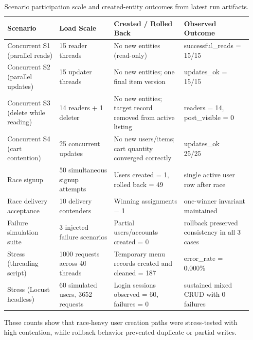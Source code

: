 \documentclass[a4paper, 11pt]{article}
\begin{document}
\renewcommand{\arraystretch}{1.25}
\begin{table}[h]
\centering
\begin{tabularx}{\textwidth}{|p{4.1cm}|p{4.0cm}|p{4.4cm}|X|}
\hline
\rowcolor{HeaderGray}
\textbf{Scenario} & \textbf{Load Scale} & \textbf{Created / Rolled Back} & \textbf{Observed Outcome} \\ \hline
Concurrent S1 (parallel reads) & 15 reader threads & No new entities (read-only) & successful\_reads = 15/15 \\ \hline
Concurrent S2 (parallel updates) & 15 updater threads & No new entities; one final item version & updates\_ok = 15/15 \\ \hline
Concurrent S3 (delete while reading) & 14 readers + 1 deleter & No new entities; target record removed from active listing & readers = 14, post\_visible = 0 \\ \hline
Concurrent S4 (cart contention) & 25 concurrent updates & No new users/items; cart quantity converged correctly & updates\_ok = 25/25 \\ \hline
Race signup & 50 simultaneous signup attempts & Users created = 1, rolled back = 49 & single active user row after race \\ \hline
Race delivery acceptance & 10 delivery contenders & Winning assignments = 1 & one-winner invariant maintained \\ \hline
Failure simulation suite & 3 injected failure scenarios & Partial users/accounts created = 0 & rollback preserved consistency in all 3 cases \\ \hline
Stress (threading script) & 1000 requests across 40 threads & Temporary menu records created and cleaned = 187 & error\_rate = 0.000\% \\ \hline
Stress (Locust headless) & 60 simulated users, 3652 requests & Login sessions observed = 60, failures = 0 & sustained mixed CRUD with 0 failures \\ \hline
\end{tabularx}
\caption{Scenario participation scale and created-entity outcomes from latest run artifacts.}
\label{tab:scenario-scale}
\end{table}

\vspace{0.2cm}
\noindent These counts show that race-heavy user creation paths were stress-tested with high contention, while rollback behavior prevented duplicate or partial writes.
\end{document}
